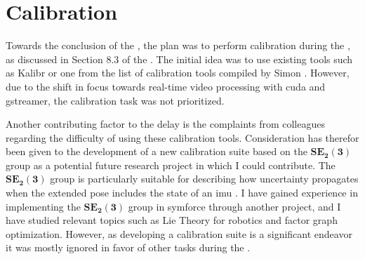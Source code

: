 \section{Calibration}
Towards the conclusion of the \preproject, the plan was to perform calibration during the \master, as discussed in Section 8.3 of the \preproject.
The initial idea was to use existing tools such as Kalibr or one from the list of calibration tools compiled by Simon \cite{EthzaslKalibr2023}\cite{simonCameraCalibTools2023}.
However, due to the shift in focus towards real-time video processing with \gls{cuda} and \gls{gstreamer}, the calibration task was not prioritized.

\todo Another contributing factor to the delay is the complaints from colleagues regarding the difficulty of using these calibration tools.
Consideration has therefor been given to the development of a new calibration suite based on the $\mathbf{SE_2(3)}$ group as a potential future research project in which I could contribute.
The $\mathbf{SE_2(3)}$ group is particularly suitable for describing how uncertainty propagates when the extended pose includes the state of an \gls{imu} \cite{barfootAssociatingUncertaintyThreeDimensional2014}.
I have gained experience in implementing the $\mathbf{SE_2(3)}$ group in \gls{symforce} through another project, and I have studied relevant topics such as Lie Theory for robotics and factor graph optimization.
However, as developing a calibration suite is a significant endeavor it was mostly ignored in favor of other tasks during the \master.